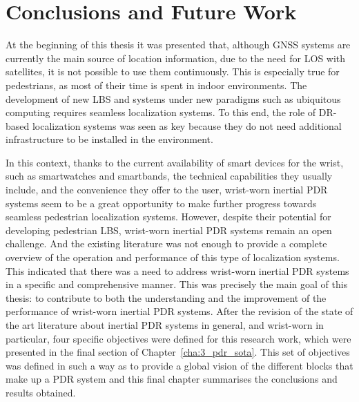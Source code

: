 
\chapter{Conclusions and Future Work}
\label{cha:10_conclusions}

\ifpdf
    \graphicspath{{10_conclusions/figures/PNG/}{10_conclusions/figures/PDF/}{10_conclusions/figures/}}
\else
    \graphicspath{{10_conclusions/figures/EPS/}{10_conclusions/figures/}}
\fi


At the beginning of this thesis it was presented that, although GNSS systems are currently the main source of location information, due to the need for LOS with satellites, it is not possible to use them continuously.
This is especially true for pedestrians, as most of their time is spent in indoor environments.
The development of new LBS and systems under new paradigms such as ubiquitous computing requires seamless localization systems.
To this end, the role of DR-based localization systems was seen as key because they do not need additional infrastructure to be installed in the environment.

In this context, thanks to the current availability of smart devices for the wrist, such as smartwatches and smartbands, the technical capabilities they usually include, and the convenience they offer to the user, wrist-worn inertial PDR systems seem to be a great opportunity to make further progress towards seamless pedestrian localization systems.
However, despite their potential for developing pedestrian LBS, wrist-worn inertial PDR systems remain an open challenge.
And the existing literature was not enough to provide a complete overview of the operation and performance of this type of localization systems.
This indicated that there was a need to address wrist-worn inertial PDR systems in a specific and comprehensive manner. 
This was precisely the main goal of this thesis: 
to contribute to both the understanding and the improvement of the performance of wrist-worn inertial PDR systems.
After the revision of the state of the art literature about inertial PDR systems in general, and wrist-worn in particular, four specific objectives were defined for this research work, which were presented in the final section of Chapter~\ref{cha:3_pdr_sota}.
This set of objectives was defined in such a way as to provide a global vision of the different blocks that make up a PDR system and this final chapter summarises the conclusions and results obtained.

